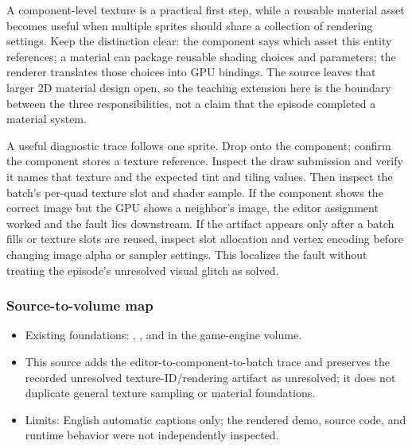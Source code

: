 A component-level texture is a practical first step, while a reusable material asset becomes useful when multiple sprites should share a collection of rendering settings. Keep the distinction clear: the component says which asset this entity references; a material can package reusable shading choices and parameters; the renderer translates those choices into GPU bindings. The source leaves that larger 2D material design open, so the teaching extension here is the boundary between the three responsibilities, not a claim that the episode completed a material system.

A useful diagnostic trace follows one sprite. Drop  onto the component; confirm the component stores a texture reference. Inspect the draw submission and verify it names that texture and the expected tint and tiling values. Then inspect the batch's per-quad texture slot and shader sample. If the component shows the correct image but the GPU shows a neighbor's image, the editor assignment worked and the fault lies downstream. If the artifact appears only after a batch fills or texture slots are reused, inspect slot allocation and vertex encoding before changing image alpha or sampler settings. This localizes the fault without treating the episode's unresolved visual glitch as solved.

\subsubsection{Source-to-volume map}\label{06-engine-ii-ch026-source-to-volume-map-1}

\hypertarget{06-engine-ii-ch026-source-to-volume-map-1}{}

\begin{itemize}
\tightlist
\item
  Existing foundations: , , and  in the game-engine volume.
\item
  This source adds the editor-to-component-to-batch trace and preserves the recorded unresolved texture-ID/rendering artifact as unresolved; it does not duplicate general texture sampling or material foundations.
\item
  Limits: English automatic captions only; the rendered demo, source code, and runtime behavior were not independently inspected.
\end{itemize}

